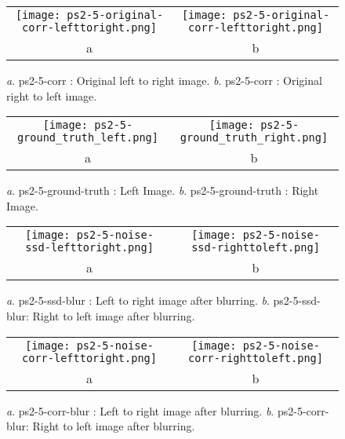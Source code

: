 \documentclass[a4paper,11pt]{article}
\begin{document}
 \begin{figure}[H]
\begin{center}
\begin{tabular}{cc}
	\texttt{[image: ps2-5-original-corr-lefttoright.png]}&
	\texttt{[image: ps2-5-original-corr-lefttoright.png]}\\
	a&b
\end{tabular}
\end{center}
\caption{ 
\textit{a}. ps2-5-corr : Original left to right image.  \textit{b}. ps2-5-corr : Original right to left image. }
\label{ps2-1}
\end{figure}


 \begin{figure}[H]
\begin{center}
\begin{tabular}{cc}
	\texttt{[image: ps2-5-ground\_truth\_left.png]}&
	\texttt{[image: ps2-5-ground\_truth\_right.png]}\\
	a&b
\end{tabular}
\end{center}
\caption{ 
\textit{a}. ps2-5-ground-truth : Left Image.  \textit{b}. ps2-5-ground-truth : Right Image. }
\label{ps2-1}
\end{figure}




\begin{figure}[H]
\begin{center}
\begin{tabular}{cc}
	\texttt{[image: ps2-5-noise-ssd-lefttoright.png]}&
	\texttt{[image: ps2-5-noise-ssd-righttoleft.png]}\\
	a&b
\end{tabular}
\end{center}
\caption{ 
\textit{a}. ps2-5-ssd-blur : Left to right image after blurring.  \textit{b}. ps2-5-ssd-blur: Right to left image after blurring. }
\label{ps2-1}
\end{figure}


 \begin{figure}[H]
\begin{center}
\begin{tabular}{cc}
	\texttt{[image: ps2-5-noise-corr-lefttoright.png]}&
	\texttt{[image: ps2-5-noise-corr-righttoleft.png]}\\
	a&b
\end{tabular}
\end{center}
\caption{ 
\textit{a}. ps2-5-corr-blur : Left to right image after blurring.  \textit{b}. ps2-5-corr-blur: Right to left image after blurring. }
\label{ps2-1}
\end{figure}
\end{document}
